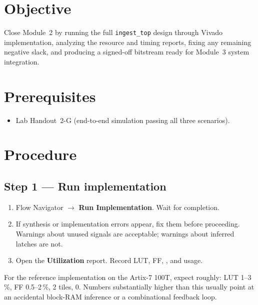 \documentclass[11pt,letterpaper]{article}
\begin{document}

\section{Objective}
Close Module~2 by running the full \texttt{ingest\_top} design through Vivado implementation, analyzing the resource and timing reports, fixing any remaining negative slack, and producing a signed-off bitstream ready for Module~3 system integration.

\section{Prerequisites}
\begin{itemize}[leftmargin=2em]
	\item Lab Handout~2-G (end-to-end simulation passing all three scenarios).
\end{itemize}

\section{Procedure}

\subsection{Step 1 --- Run implementation}
\begin{enumerate}[leftmargin=2em]
	\item Flow Navigator $\to$ \textbf{Run Implementation}. Wait for completion.
	\item If synthesis or implementation errors appear, fix them before proceeding. Warnings about unused signals are acceptable; warnings about inferred latches are not.
	\item Open the \textbf{Utilization} report. Record \mbox{LUT}, \mbox{FF}, \BRAM{}, and \DSP{} usage.
\end{enumerate}

\begin{tcolorbox}[infobox={Expected utilization envelope}]
	For the reference implementation on the Artix-7 100T, expect roughly: \mbox{LUT} 1--3\,\%, \mbox{FF} 0.5--2\,\%, \BRAM{} 2 tiles, \DSP{} 0. Numbers substantially higher than this usually point at an accidental block-\mbox{RAM} inference or a combinational feedback loop.
\end{tcolorbox}
\end{document}
